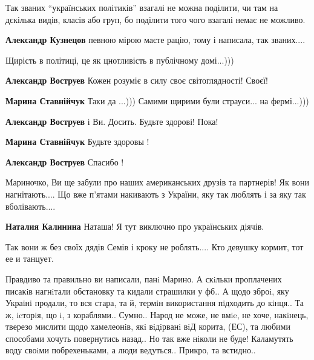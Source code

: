  
 
 
 
 
\zzSecCmt

\begin{itemize} %

Так званих \enquote{українських політиків} взагалі не можна поділити, чи там на
дєкілька видів, класів або груп, бо поділити того чого взагалі немає не
можливо.

\textbf{Александр Кузнецов} певною мірою маєте рацію, тому і написала, так званих....

Щирість в політиці, це як цнотливість в публічному домі...)))

\begin{itemize} %
\textbf{Александр Воструев} Кожен розуміє в силу своє світоглядності! Своєї!

\textbf{Марина Ставнійчук} Таки да ...))) Самими щирими були страуси... на фермі...)))

\textbf{Александр Воструев} і Ви. Досить. Будьте здорові! Пока!

\textbf{Марина Ставнійчук} Будьте здоровы !

\textbf{Александр Воструев} Спасибо !
\end{itemize} %


Мариночко, Ви ще забули про наших американських друзів та партнерів! Як вони
нагнітають.... Що вже п'ятами накивають з України, яку так люблять і за яку так
вболівають....

\textbf{Наталия Калинина} Наташа! Я тут виключно про українських діячів.


Так вони ж без своїх дядів Семів і кроку не роблять.... Кто девушку кормит, тот
ее и танцует.


Правдиво та правильно ви написали, панi Марино. А скiльки проплачених писакiв
нагнiтали обстановку та кидали страшилки у фб.. А щодо зброi, яку Украiнi
продали, то вся стара, та й, термiн використання пiдходить до кiнця.. Та
ж, icторiя, що i, з кораблями.. Сумно.. Народ не може, не вмie, не
хоче, накiнець, тверезо мислити щодо хамелеонiв, якi вiдiрванi вiД корита, (ЕС), та
любими способами хочуть повернутись назад.. Но так вже нiколи не буде! Каламутять
воду своiми побрехеньками, а люди ведуться.. Прикро, та встидно..


\end{itemize}
